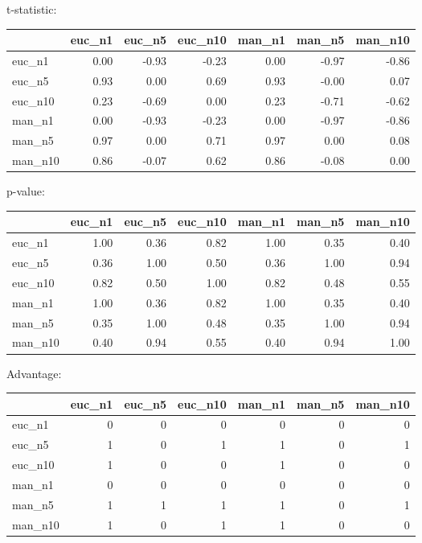t-statistic:
 \begin{tabular}{lrrrrrr}
\hline
         &   euc\_n1 &   euc\_n5 &   euc\_n10 &   man\_n1 &   man\_n5 &   man\_n10 \\
\hline
 euc\_n1  &     0.00 &    -0.93 &     -0.23 &     0.00 &    -0.97 &     -0.86 \\
 euc\_n5  &     0.93 &     0.00 &      0.69 &     0.93 &    -0.00 &      0.07 \\
 euc\_n10 &     0.23 &    -0.69 &      0.00 &     0.23 &    -0.71 &     -0.62 \\
 man\_n1  &     0.00 &    -0.93 &     -0.23 &     0.00 &    -0.97 &     -0.86 \\
 man\_n5  &     0.97 &     0.00 &      0.71 &     0.97 &     0.00 &      0.08 \\
 man\_n10 &     0.86 &    -0.07 &      0.62 &     0.86 &    -0.08 &      0.00 \\
\hline
\end{tabular} 

p-value:
 \begin{tabular}{lrrrrrr}
\hline
         &   euc\_n1 &   euc\_n5 &   euc\_n10 &   man\_n1 &   man\_n5 &   man\_n10 \\
\hline
 euc\_n1  &     1.00 &     0.36 &      0.82 &     1.00 &     0.35 &      0.40 \\
 euc\_n5  &     0.36 &     1.00 &      0.50 &     0.36 &     1.00 &      0.94 \\
 euc\_n10 &     0.82 &     0.50 &      1.00 &     0.82 &     0.48 &      0.55 \\
 man\_n1  &     1.00 &     0.36 &      0.82 &     1.00 &     0.35 &      0.40 \\
 man\_n5  &     0.35 &     1.00 &      0.48 &     0.35 &     1.00 &      0.94 \\
 man\_n10 &     0.40 &     0.94 &      0.55 &     0.40 &     0.94 &      1.00 \\
\hline
\end{tabular} 

Advantage:
 \begin{tabular}{lrrrrrr}
\hline
         &   euc\_n1 &   euc\_n5 &   euc\_n10 &   man\_n1 &   man\_n5 &   man\_n10 \\
\hline
 euc\_n1  &        0 &        0 &         0 &        0 &        0 &         0 \\
 euc\_n5  &        1 &        0 &         1 &        1 &        0 &         1 \\
 euc\_n10 &        1 &        0 &         0 &        1 &        0 &         0 \\
 man\_n1  &        0 &        0 &         0 &        0 &        0 &         0 \\
 man\_n5  &        1 &        1 &         1 &        1 &        0 &         1 \\
 man\_n10 &        1 &        0 &         1 &        1 &        0 &         0 \\
\hline
\end{tabular} 

